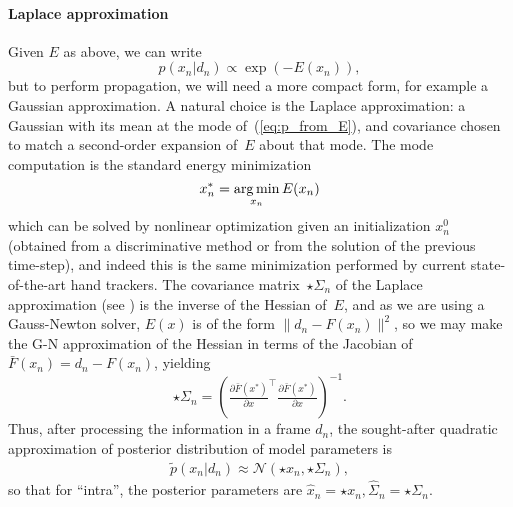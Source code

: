 
\paragraph{Laplace approximation}
\label{sec:posterior}
Given $E$ as above, we can write
\begin{equation}
p(x_n|d_n) \propto \exp(-E(x_n)), 
\label{eq:p_from_E}
\end{equation}
but to perform propagation, we will need a more compact form, for example a Gaussian approximation.   A natural choice is the Laplace approximation: a Gaussian with its mean at the mode of~(\ref{eq:p_from_E}), and covariance chosen to match a second-order expansion of~$E$ about that mode.
The mode computation is the standard energy minimization
\begin{equation}
{x}^*_n = \operatorname*{arg\,min}_{x_n} E(x_n)
\label{eq:xmin}
\end{equation}
which can be solved by nonlinear optimization given an initialization $x_n^0$ (obtained from a discriminative method or from the solution of the previous time-step), and indeed this is the same minimization performed by current state-of-the-art hand trackers.
The covariance matrix~$\star\Sigma_n$ of the Laplace approximation (see ) is the inverse of the Hessian of~$E$, and as we are using a Gauss-Newton solver, $E(x)$ is of the form $\|d_n - F(x_n)\|^2$, so we may make the G-N approximation of the Hessian in terms of the Jacobian of~
$\bar{F}(x_n) = d_n - F(x_n)$, yielding
\begin{equation}
{\star{\Sigma}_n} = \left(\tfrac{\partial \bar{F}(x^*)}{\partial x}^\top \tfrac{\partial \bar{F}(x^*)}{\partial x}\right)^{-1}.
\end{equation}
Thus, after processing the information in a frame $d_n$, the sought-after quadratic approximation of posterior distribution of model parameters is 
\begin{align}
\tilde{p}(x_n|d_n) \approx \mathcal{N}\left(\star{x}_n, \star{\Sigma}_n \right),
\end{align}
so that for ``intra'', the posterior parameters are $\hat x_n = \star x_n, \hat\Sigma_n = \star\Sigma_n$.


